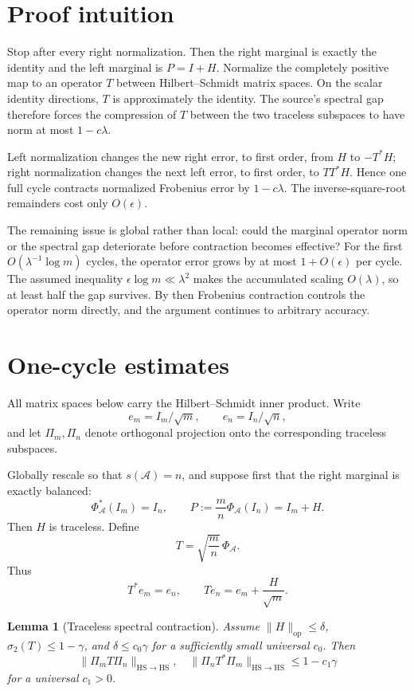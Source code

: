 \documentclass[11pt]{article}
\newtheorem{lemma}[theorem]{Lemma}
\newcommand{\Acal}{\mathcal A}
\newcommand{\PhiA}{\Phi_{\Acal}}
\newcommand{\op}{\mathrm{op}}
\newcommand{\HS}{\mathrm{HS}}
\begin{document}
\section{Proof intuition}

Stop after every right normalization.  Then the right marginal is exactly the
identity and the left marginal is $P=I+H$.  Normalize the completely positive
map to an operator $T$ between Hilbert--Schmidt matrix spaces.  On the scalar
identity directions, $T$ is approximately the identity.  The source's
spectral gap therefore forces the compression of $T$ between the two
traceless subspaces to have norm at most $1-c\lambda$.

Left normalization changes the new right error, to first order, from $H$ to
$-T^*H$; right normalization changes the next left error, to first order, to
$TT^*H$.  Hence one full cycle contracts normalized Frobenius error by
$1-c\lambda$.  The inverse-square-root remainders cost only $O(\epsilon)$.

The remaining issue is global rather than local: could the marginal operator
norm or the spectral gap deteriorate before contraction becomes effective?
For the first $O(\lambda^{-1}\log m)$ cycles, the operator error grows by at
most $1+O(\epsilon)$ per cycle.  The assumed inequality
$\epsilon\log m\ll\lambda^2$ makes the accumulated scaling $O(\lambda)$, so
at least half the gap survives.  By then Frobenius contraction controls the
operator norm directly, and the argument continues to arbitrary accuracy.

\section{One-cycle estimates}

All matrix spaces below carry the Hilbert--Schmidt inner product.  Write
\[
 e_m=I_m/\sqrt m,\qquad e_n=I_n/\sqrt n,
\]
and let $\Pi_m,\Pi_n$ denote orthogonal projection onto the corresponding
traceless subspaces.

Globally rescale so that $s(\Acal)=n$, and suppose first that the right
marginal is exactly balanced:
\[
 \PhiA^*(I_m)=I_n,\qquad
 P:=\frac mn\PhiA(I_n)=I_m+H.
\]
Then $H$ is traceless.  Define
\[
 T=\sqrt{\frac mn}\,\PhiA.
\]
Thus
\[
 T^*e_m=e_n,\qquad Te_n=e_m+\frac{H}{\sqrt m}.
\]

\begin{lemma}[Traceless spectral contraction]\label{lem:trace}
Assume $\|H\|_{\op}\le\delta$, $\sigma_2(T)\le1-\gamma$, and
$\delta\le c_0\gamma$ for a sufficiently small universal $c_0$.  Then
\[
 \|\Pi_mT\Pi_n\|_{\HS\to\HS},\quad
 \|\Pi_nT^*\Pi_m\|_{\HS\to\HS}
 \le 1-c_1\gamma
\]
for a universal $c_1>0$.
\end{lemma}
\end{document}
